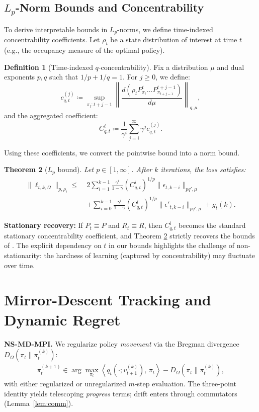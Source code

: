 \documentclass{article}
\theoremstyle{plain}
\newtheorem{theorem}{Theorem}[section]
\theoremstyle{definition}
\newtheorem{definition}[theorem]{Definition}
\theoremstyle{remark}
\newcommand{\1}{\mathbbm{1}}
\newcommand{\ip}[2]{\left\langle #1,\,#2 \right\rangle}
\begin{document}
\subsection{\texorpdfstring{$L_p$}{Lp}-Norm Bounds and Concentrability}

To derive interpretable bounds in $L_p$-norms, we define time-indexed concentrability coefficients. Let $\rho_t$ be a state distribution of interest at time $t$ (e.g., the occupancy measure of the optimal policy).

\begin{definition}[Time-indexed $q$-concentrability]
\label{def:concentrability}
Fix a distribution $\mu$ and dual exponents $p, q$ such that $1/p + 1/q = 1$. For $j \ge 0$, we define:
\begin{equation}
    c_{q,t}^{(j)} \coloneqq \sup_{\pi_t:t+j-1} \left\| \frac{d(\rho_t P_{\pi_t}^t \dots P_{\pi_{t+j-1}}^{t+j-1})}{d\mu} \right\|_{q,\mu},
\end{equation}
and the aggregated coefficient:
\begin{equation}
    C_{q,t}^i \coloneqq \frac{1}{\gamma^i} \sum_{j=i}^\infty \gamma^j c_{q,t}^{(j)}.
\end{equation}
\end{definition}

Using these coefficients, we convert the pointwise bound into a norm bound.

\begin{theorem}[$L_p$ bound]
\label{thm:lp_bound}
Let $p \in [1, \infty]$. After $k$ iterations, the loss satisfies:
\begin{align}
    \|\ell_{t,k,\Omega}\|_{p,\rho_t} \le \;& 2 \sum_{i=1}^{k-1} \frac{\gamma^i}{1-\gamma} (C_{q,t}^i)^{1/p} \|\epsilon_{t,k-i}\|_{pq', \mu} \nonumber \\
    &+ \sum_{i=0}^{k-1} \frac{\gamma^i}{1-\gamma} (C_{q,t}^i)^{1/p} \|\epsilon'_{t,k-i}\|_{pq', \mu} + g_t(k).
\end{align}
\end{theorem}

\textbf{Stationary recovery:} If $P_t \equiv P$ and $R_t \equiv R$, then $C_{q,t}^i$ becomes the standard stationary concentrability coefficient, and Theorem \ref{thm:lp_bound} strictly recovers the bounds of \cite{geist2019theory}. The explicit dependency on $t$ in our bounds highlights the challenge of non-stationarity: the hardness of learning (captured by concentrability) may fluctuate over time.

\section{Mirror-Descent Tracking and Dynamic Regret}\label{sec:md}
\textbf{NS-MD-MPI.} We regularize policy \emph{movement} via the Bregman divergence $D_\Omega(\pi_t\|\pi^{(k)}_t)$:
\begin{align}
\pi_t^{(k+1)} \in \arg\max_{\pi_t}\ip{q_t(\cdot; v^{(k)}_{t+1})}{\pi_t} - D_\Omega(\pi_t\|\pi^{(k)}_t), \label{eq:md-greedy}
\end{align}
with either regularized or unregularized $m$-step evaluation. The three-point identity yields telescoping \emph{progress} terms; drift enters through commutators (Lemma~\ref{lem:comm}).
\end{document}
